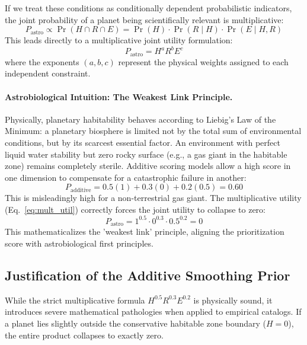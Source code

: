 \documentclass[11pt,a4paper]{article}
\begin{document}
If we treat these conditions as conditionally dependent probabilistic indicators, the joint probability of a planet being scientifically relevant is multiplicative:
\begin{equation}
P_{\text{astro}} \propto \Pr(H \cap R \cap E) = \Pr(H) \cdot \Pr(R \mid H) \cdot \Pr(E \mid H, R)
\label{eq:prob_mult}
\end{equation}
This leads directly to a multiplicative joint utility formulation:
\begin{equation}
P_{\text{astro}} = H^a R^b E^c
\label{eq:mult_util}
\end{equation}
where the exponents $(a,b,c)$ represent the physical weights assigned to each independent constraint.

\paragraph{Astrobiological Intuition: The Weakest Link Principle.} 
Physically, planetary habitability behaves according to Liebig's Law of the Minimum: a planetary biosphere is limited not by the total sum of environmental conditions, but by its scarcest essential factor. An environment with perfect liquid water stability but zero rocky surface (e.g., a gas giant in the habitable zone) remains completely sterile. Additive scoring models allow a high score in one dimension to compensate for a catastrophic failure in another:
\begin{equation}
P_{\text{additive}} = 0.5(1) + 0.3(0) + 0.2(0.5) = 0.60
\end{equation}
This is misleadingly high for a non-terrestrial gas giant. The multiplicative utility (Eq.~\ref{eq:mult_util}) correctly forces the joint utility to collapse to zero:
\begin{equation}
P_{\text{astro}} = 1^{0.5} \cdot 0^{0.3} \cdot 0.5^{0.2} = 0
\end{equation}
This mathematicalizes the 'weakest link' principle, aligning the prioritization score with astrobiological first principles.

\subsection{Justification of the Additive Smoothing Prior}

While the strict multiplicative formula $H^{0.5} R^{0.3} E^{0.2}$ is physically sound, it introduces severe mathematical pathologies when applied to empirical catalogs. If a planet lies slightly outside the conservative habitable zone boundary ($H = 0$), the entire product collapses to exactly zero.
\end{document}
